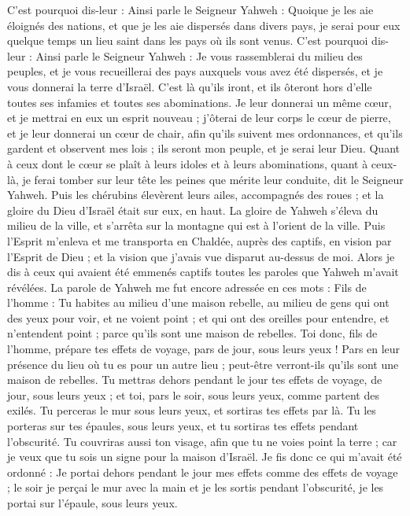 \begin{multicols}{2}
C'est pourquoi dis-leur : Ainsi parle le Seigneur Yahweh : Quoique je les aie éloignés des nations, et que je les aie dispersés dans divers pays, je serai pour eux quelque temps un lieu saint\FTNT{} dans les pays où ils sont venus.
C'est pourquoi dis-leur : Ainsi parle le Seigneur Yahweh : Je vous rassemblerai du milieu des peuples, et je vous recueillerai des pays auxquels vous avez été dispersés, et je vous donnerai la terre d'Israël\FTNT{}.
C’est là qu’ils iront, et ils ôteront hors d'elle toutes ses infamies et toutes ses abominations.
Je leur donnerai  un même cœur, et je mettrai en eux un esprit nouveau ; j'ôterai de leur corps le cœur de pierre, et je leur donnerai un cœur de chair\FTNT{},
afin qu'ils suivent mes ordonnances, et qu'ils gardent et observent mes lois ; ils seront mon peuple, et je serai leur Dieu.
Quant à ceux dont le cœur se plaît à leurs idoles et à leurs abominations, quant à ceux-là, je ferai tomber sur leur tête les peines que mérite leur conduite, dit le Seigneur Yahweh.
Puis les chérubins élevèrent leurs ailes, accompagnés des roues ; et la gloire du Dieu d'Israël était sur eux, en haut.
La gloire de Yahweh s'éleva du milieu de la ville\FTNT{}, et s'arrêta sur la montagne qui est à l'orient de la ville.
Puis l'Esprit m'enleva et me transporta en Chaldée, auprès des captifs, en vision par l'Esprit de Dieu ; et la vision que j'avais vue disparut au-dessus de moi.
Alors je dis à ceux qui avaient été emmenés captifs toutes les paroles que Yahweh m'avait révélées.
\VerseOne{}La parole de Yahweh me fut encore adressée en ces mots :
Fils de l’homme : Tu habites au milieu d'une maison rebelle, au milieu de gens qui ont des yeux pour voir, et ne voient point ; et qui ont des oreilles pour entendre, et n'entendent point ; parce qu'ils sont une maison de rebelles\FTNT{}.
Toi donc, fils de l’homme, prépare tes effets de voyage, pars de jour, sous leurs yeux ! Pars en leur présence du lieu où tu es pour un autre lieu ; peut-être verront-ils qu’ils sont une maison de rebelles.
Tu mettras dehors pendant le jour tes effets de voyage, de jour, sous leurs yeux ; et toi, pars le soir, sous leurs yeux, comme partent des exilés.
Tu perceras le mur sous leurs yeux, et sortiras tes effets par là.
Tu les porteras sur tes épaules, sous leurs yeux, et tu sortiras tes effets pendant l’obscurité. Tu couvriras aussi ton visage, afin que tu ne voies point la terre ; car je veux que tu sois un signe pour la maison d'Israël.
Je fis donc ce qui m'avait été ordonné : Je portai dehors pendant le jour mes effets comme des effets de voyage ; le soir je perçai le mur avec la main et je les sortis pendant l’obscurité, je les portai sur l'épaule, sous leurs yeux.

\end{multicols}
